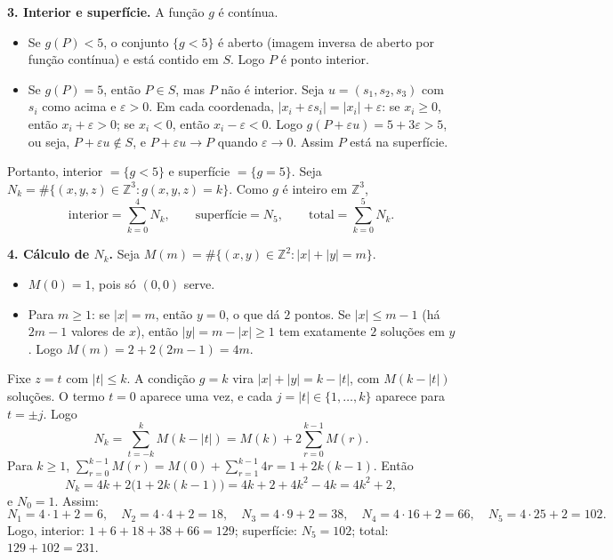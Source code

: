 \documentclass{article}%
\begin{document}
\textbf{3. Interior e superfície.} A função $g$ é contínua.
\begin{itemize}
\item Se $g(P)<5$, o conjunto $\{g<5\}$ é aberto (imagem inversa de aberto por função contínua) e está contido em $S$. Logo $P$ é ponto interior.
\item Se $g(P)=5$, então $P\in S$, mas $P$ não é interior. Seja $u=(s_1,s_2,s_3)$ com $s_i$ como acima e $\varepsilon>0$. Em cada coordenada, $|x_i+\varepsilon s_i|=|x_i|+\varepsilon$: se $x_i\ge 0$, então $x_i+\varepsilon>0$; se $x_i<0$, então $x_i-\varepsilon<0$. Logo $g(P+\varepsilon u)=5+3\varepsilon>5$, ou seja, $P+\varepsilon u\notin S$, e $P+\varepsilon u\to P$ quando $\varepsilon\to 0$. Assim $P$ está na superfície.
\end{itemize}
Portanto, interior $=\{g<5\}$ e superfície $=\{g=5\}$. Seja $N_k=\#\{(x,y,z)\in\mathbb{Z}^3 : g(x,y,z)=k\}$. Como $g$ é inteiro em $\mathbb{Z}^3$,
\[
\text{interior}=\sum_{k=0}^{4}N_k,\qquad \text{superfície}=N_5,\qquad \text{total}=\sum_{k=0}^{5}N_k.
\]

\textbf{4. Cálculo de $N_k$.} Seja $M(m)=\#\{(x,y)\in\mathbb{Z}^2 : |x|+|y|=m\}$.
\begin{itemize}
\item $M(0)=1$, pois só $(0,0)$ serve.
\item Para $m\ge 1$: se $|x|=m$, então $y=0$, o que dá $2$ pontos. Se $|x|\le m-1$ (há $2m-1$ valores de $x$), então $|y|=m-|x|\ge 1$ tem exatamente $2$ soluções em $y$. Logo $M(m)=2+2(2m-1)=4m$.
\end{itemize}
Fixe $z=t$ com $|t|\le k$. A condição $g=k$ vira $|x|+|y|=k-|t|$, com $M(k-|t|)$ soluções. O termo $t=0$ aparece uma vez, e cada $j=|t|\in\{1,\dots,k\}$ aparece para $t=\pm j$. Logo
\[
N_k=\sum_{t=-k}^{k}M(k-|t|)=M(k)+2\sum_{r=0}^{k-1}M(r).
\]
Para $k\ge 1$, $\sum_{r=0}^{k-1}M(r)=M(0)+\sum_{r=1}^{k-1}4r=1+2k(k-1)$. Então
\[
N_k=4k+2\bigl(1+2k(k-1)\bigr)=4k+2+4k^2-4k=4k^2+2,
\]
e $N_0=1$. Assim:
\[
N_1=4\cdot 1+2=6,\quad N_2=4\cdot 4+2=18,\quad N_3=4\cdot 9+2=38,\quad N_4=4\cdot 16+2=66,\quad N_5=4\cdot 25+2=102.
\]
Logo, interior: $1+6+18+38+66=129$; superfície: $N_5=102$; total: $129+102=231$.
\end{document}
